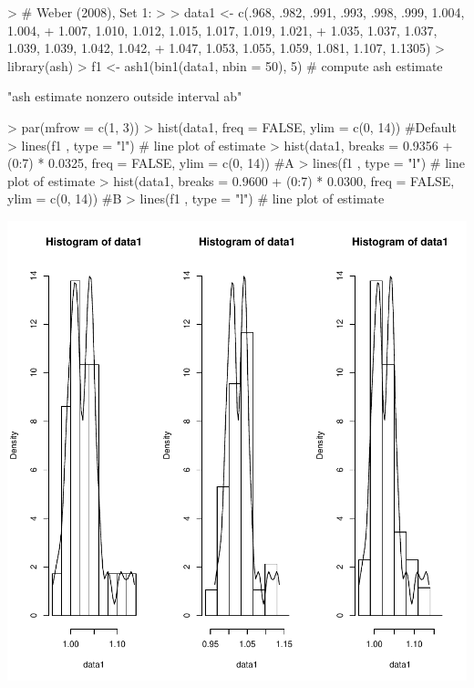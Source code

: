 \begin{Schunk}
\begin{Sinput}
> # Weber (2008), Set 1:
> 
> data1 <- c(.968, .982, .991, .993, .998, .999, 1.004, 1.004,
+   1.007, 1.010, 1.012, 1.015, 1.017, 1.019, 1.021,
+   1.035, 1.037, 1.037, 1.039, 1.039, 1.042, 1.042,
+   1.047, 1.053, 1.055, 1.059, 1.081, 1.107, 1.1305)
> library(ash)
> f1 <- ash1(bin1(data1, nbin = 50), 5) # compute ash estimate
\end{Sinput}
\begin{Soutput}
[1] "ash estimate nonzero outside interval ab"
\end{Soutput}
\begin{Sinput}
> par(mfrow = c(1, 3))
> hist(data1, freq = FALSE, ylim = c(0, 14)) #Default
> lines(f1 , type = "l") # line plot of estimate
> hist(data1, breaks = 0.9356 + (0:7) * 0.0325, freq = FALSE, ylim = c(0, 14)) #A
> lines(f1 , type = "l") # line plot of estimate
> hist(data1, breaks = 0.9600 + (0:7) * 0.0300, freq = FALSE, ylim = c(0, 14)) #B
> lines(f1 , type = "l") # line plot of estimate
\end{Sinput}
\end{Schunk}
\includegraphics{lect_chapter5_v2-007}


